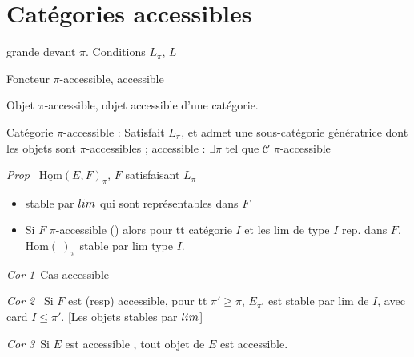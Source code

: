 \documentclass[11pt,a4paper]{article}
\begin{document}
\section*{Catégories accessibles}

  grande devant $\pi$.
Conditions $L_{\pi}$, $L$ 

Foncteur $\pi$-accessible, accessible 

Objet $\pi$-accessible, objet accessible d'une catégorie.

Catégorie $\pi$-accessible : Satisfait $L_{\pi}$, et admet une 
sous-catégorie génératrice   dont
les objets sont $\pi$-accessibles ; accessible : $\exists \pi$ tel que
$\mathcal{C}$ $\pi$-accessible


\emph{Prop}\ \struck{\ill{}} $\underline{\mathrm{Hom}}(E, F)_{\pi}$,
$F$ satisfaisant $L_{\pi}$
\begin{itemize}
  \item[a)] stable par  $\varinjlim$ qui sont représentables
    dans $F$
  \item[b)] Si $F$ $\pi$-accessible (\ill{}) alors pour tt catégorie $I$
     et les lim de type $I$ rep. dans $F$,
    $\underline{\mathrm{Hom}}(\ )_{\pi}$ stable par lim type $I$.
\end{itemize}
\struck{\ill{}}

\emph{Cor 1}\ Cas accessible

\emph{Cor 2}\ \struck{\ill{}} Si $F$ est (resp) \struck{\ill{}}
\supplied{$\pi$-}accessible, \struck{\ill{}} pour tt $\pi' \geqslant \pi$,
$E_{\pi'}$ est stable par lim de  $I$, avec card $I \leqslant
\pi'$. [Les objets \ill{} stables par  $\varinjlim$]

\emph{Cor 3}\ Si  $E$ est accessible , tout objet de $E$ est accessible.
\end{document}
